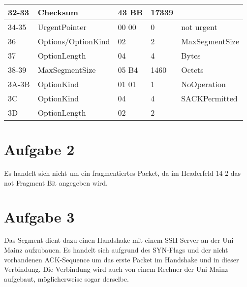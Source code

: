 \begin{tabular}{|l|l|l|l|l|}
32-33 & Checksum & 43 BB & 17339 & \\\hline
34-35 & UrgentPointer & 00 00 & 0 & not urgent \\\hline
36 & Options/OptionKind & 02 & 2 & MaxSegmentSize \\\hline
37 & OptionLength & 04 & 4 & Bytes \\\hline
38-39 & MaxSegmentSize & 05 B4 & 1460 & Octets \\\hline
3A-3B & OptionKind & 01 01 & 1 & NoOperation \\\hline
3C & OptionKind & 04 & 4 & SACKPermitted \\\hline
3D & OptionLength & 02 & 2 & \\\hline
\end{tabular}

\section{Aufgabe 2}
Es handelt sich nicht um ein fragmentiertes Packet, da im Headerfeld $14$ $2$ das not Fragment Bit angegeben wird.

\section{Aufgabe 3}
Das Segment dient dazu einen Handshake mit einem SSH-Server an der Uni Mainz aufzubauen. Es handelt sich aufgrund des SYN-Flags und der nicht vorhandenen ACK-Sequence um das erste Packet im Handshake und in dieser Verbindung. Die Verbindung wird auch von einem Rechner der Uni Mainz aufgebaut, möglicherweise sogar derselbe.
